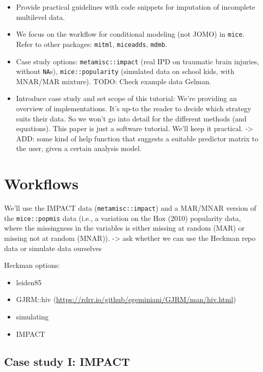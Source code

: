 \documentclass[
]{jss}
\begin{document}
\begin{itemize}
\item
  Provide practical guidelines with code snippets for imputation of
  incomplete multilevel data.
\item
  We focus on the workflow for conditional modeling (not JOMO) in
  \texttt{mice}. Refer to other packages: \texttt{mitml},
  \texttt{miceadds}, \texttt{mdmb}.
\item
  Case study options: \texttt{metamisc::impact} (real IPD on traumatic
  brain injuries, without \texttt{NA}s), \texttt{mice::popularity}
  (simulated data on school kids, with MNAR/MAR mixture). TODO: Check
  example data Gelman.
\item
  Introduce case study and set scope of this tutorial: We're providing
  an overview of implementations. It's up-to the reader to decide which
  strategy suits their data. So we won't go into detail for the
  different methods (and equations). This paper is just a software
  tutorial. We'll keep it practical. -\textgreater{} ADD: some kind of
  help function that suggests a suitable predictor matrix to the user,
  given a certain analysis model.
\end{itemize}

\hypertarget{workflows}{%
\section{Workflows}\label{workflows}}

We'll use the IMPACT data (\texttt{metamisc::impact}) and a MAR/MNAR
version of the \texttt{mice::popmis} data (i.e., a variation on the Hox
(2010) popularity data, where the missingness in the variables is either
missing at random (MAR) or missing not at random (MNAR)).
-\textgreater{} ask whether we can use the Heckman repo data or simulate
data ourselves

Heckman options:

\begin{itemize}
\item
  leiden85
\item
  GJRM::hiv (\url{https://rdrr.io/github/egeminiani/GJRM/man/hiv.html})
\item
  simulating
\item
  IMPACT
\end{itemize}

\hypertarget{case-study-i-impact}{%
\subsection{Case study I: IMPACT}\label{case-study-i-impact}}
\end{document}
